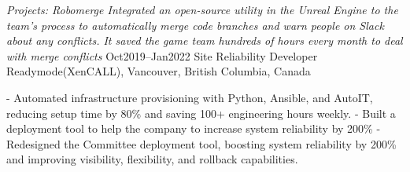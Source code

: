 \documentclass[9pt]{developercv} %
\begin{document}
\begin{entrylist}
{            \textit{Projects: Robomerge\newline
            Integrated an open-source utility in the Unreal Engine to the team’s process to automatically merge code branches and warn people on Slack about any conflicts. It saved the game team hundreds of hours every month to deal with merge conflicts\newline}
        }
    \entry
		{Oct2019--Jan2022}
		{Site Reliability Developer}
		{Readymode(XenCALL), Vancouver, British Columbia, Canada}
		{
            - Automated infrastructure provisioning with Python, Ansible, and AutoIT, reducing setup time by 80\% and saving 100+ engineering hours weekly.\newline
            - Built a deployment tool to help the company to increase system reliability by 200\%\newline
            - Redesigned the Committee deployment tool, boosting system reliability by 200\% and improving visibility, flexibility, and rollback capabilities.\newline

}
\end{entrylist}
\end{document}
